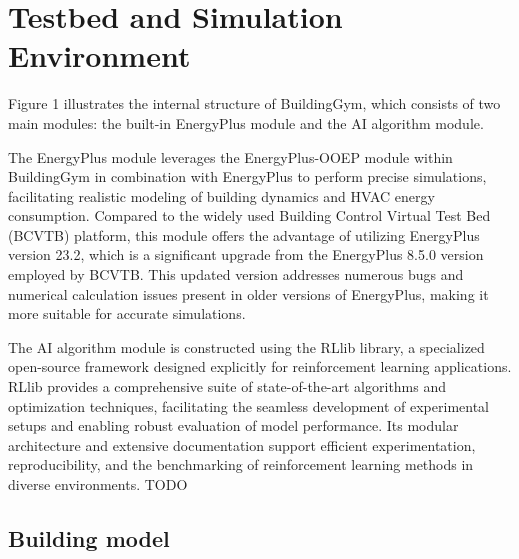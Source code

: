 \documentclass[preprint,12pt]{elsarticle}
\begin{document}
\section{Testbed and Simulation Environment}

Figure 1 illustrates the internal structure of BuildingGym, which consists of two main modules: 
the built-in EnergyPlus module and the AI algorithm module.

The EnergyPlus module leverages the EnergyPlus-OOEP module within BuildingGym in combination with 
EnergyPlus to perform precise simulations, facilitating realistic modeling of building dynamics and 
HVAC energy consumption. Compared to the widely used Building Control Virtual Test Bed (BCVTB) platform, 
this module offers the advantage of utilizing EnergyPlus version 23.2, which is a significant upgrade 
from the EnergyPlus 8.5.0 version employed by BCVTB. This updated version addresses numerous bugs and numerical 
calculation issues present in older versions of EnergyPlus, making it more suitable for accurate simulations.

The AI algorithm module is constructed using the RLlib library, a specialized open-source framework designed 
explicitly for reinforcement learning applications. RLlib provides a comprehensive suite of state-of-the-art 
algorithms and optimization techniques, facilitating the seamless development of experimental setups and 
enabling robust evaluation of model performance. Its modular architecture and extensive documentation support 
efficient experimentation, reproducibility, and the benchmarking of reinforcement learning methods in diverse environments.
TODO
\begin{figure}
    \centering
\end{figure}

\subsection{Building model}
\end{document}
